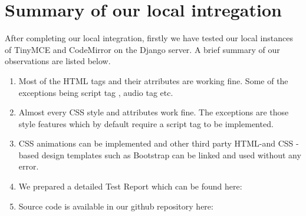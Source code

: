 \section{Summary of our local intregation}
After completing our local integration, firstly we have tested our local instances of
TinyMCE and CodeMirror on the Django server. A brief summary of our observations are
listed below.
\begin{enumerate}
\item Most of the HTML tags and their atrributes are working fine. Some of the exceptions
being script tag , audio tag etc.
\item Almost every CSS style and attributes work fine. The exceptions are those style features
which by default require a script tag to be implemented.
\item CSS animations can be implemented and other third party HTML-and CSS -based design
templates such as Bootstrap can be linked and used without any error.
\item We prepared a detailed Test Report which can be found here:\newline[\url{https://docs.google.com/spreadsheets/d/1AJQWfAG2NIjpxFZt2fnLPlKdhP2-q35KZ0DOmdb-F0w/edit#gid=0}]
\item  Source code is available in our github repository here:
\end{enumerate}


